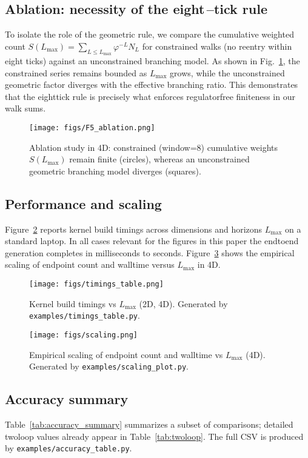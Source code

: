 \documentclass[11pt,a4paper]{article}
\theoremstyle{definition}
\theoremstyle{remark}
\begin{document}
\subsection{Ablation: necessity of the eight\mbox{\,--}tick rule}
To isolate the role of the geometric rule, we compare the cumulative weighted count
\(
  S(L_{\max})=\sum_{L\le L_{\max}} \varphi^{-L} N_L
\)
for constrained walks (no re\-entry within eight ticks) against an unconstrained branching model. As shown in Fig.~\ref{fig:F5}, the constrained series remains bounded as $L_{\max}$ grows, while the unconstrained geometric factor diverges with the effective branching ratio. This demonstrates that the eight\-tick rule is precisely what enforces regulator\-free finiteness in our walk sums.

\begin{figure}[ht]
  \centering
  \texttt{[image: figs/F5\_ablation.png]}
  \caption{Ablation study in 4D: constrained (window=8) cumulative weights $S(L_{\max})$ remain finite (circles), whereas an unconstrained geometric branching model diverges (squares).}
  \label{fig:F5}
\end{figure}

\subsection{Performance and scaling}
Figure~\ref{fig:timings} reports kernel build timings across dimensions and horizons $L_{\max}$ on a standard laptop. In all cases relevant for the figures in this paper the end\-to\-end generation completes in milliseconds to seconds. Figure~\ref{fig:scaling} shows the empirical scaling of endpoint count and wall\-time versus $L_{\max}$ in 4D.

\begin{figure}[ht]
  \centering
  \texttt{[image: figs/timings\_table.png]}
  \caption{Kernel build timings vs $L_{\max}$ (2D, 4D). Generated by \texttt{examples/timings\_table.py}.}
  \label{fig:timings}
\end{figure}

\begin{figure}[ht]
  \centering
  \texttt{[image: figs/scaling.png]}
  \caption{Empirical scaling of endpoint count and wall\-time vs $L_{\max}$ (4D). Generated by \texttt{examples/scaling\_plot.py}.}
  \label{fig:scaling}
\end{figure}

\subsection{Accuracy summary}
Table~\ref{tab:accuracy_summary} summarizes a subset of comparisons; detailed two\-loop values already appear in Table~\ref{tab:twoloop}. The full CSV is produced by \texttt{examples/accuracy\_table.py}.
\end{document}

